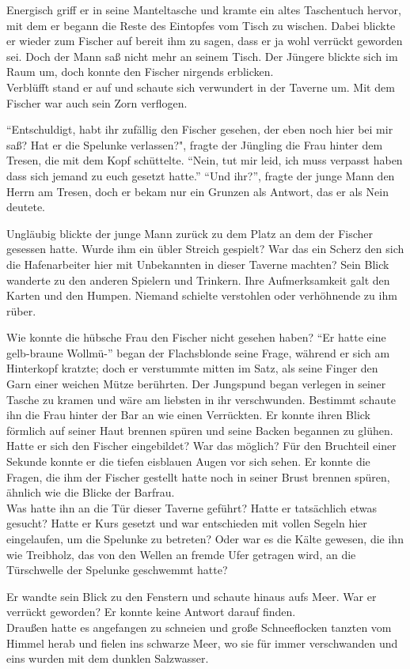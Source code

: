 Energisch griff er in seine Manteltasche und kramte ein altes Taschentuch hervor, mit dem er begann die Reste des Eintopfes vom Tisch zu wischen. Dabei blickte er wieder zum Fischer auf bereit ihm zu sagen, dass er ja wohl verrückt geworden sei. Doch der Mann saß nicht mehr an seinem Tisch. Der Jüngere blickte sich im Raum um, doch konnte den Fischer nirgends erblicken.\\

Verblüfft stand er auf und schaute sich verwundert in der Taverne um. Mit dem Fischer war auch sein Zorn verflogen.

``Entschuldigt, habt ihr zufällig den Fischer gesehen, der eben noch hier bei mir saß? Hat er die Spelunke verlassen?", fragte der Jüngling die Frau hinter dem Tresen, die mit dem Kopf schüttelte. 
``Nein, tut mir leid, ich muss verpasst haben dass sich jemand zu euch gesetzt hatte.''
``Und ihr?'', fragte der junge Mann den Herrn am Tresen, doch er bekam nur ein Grunzen als Antwort, das er als Nein deutete.

Ungläubig blickte der junge Mann zurück zu dem Platz an dem der Fischer gesessen hatte. Wurde ihm ein übler Streich gespielt? War das ein Scherz den sich die Hafenarbeiter hier mit Unbekannten in dieser Taverne machten?
Sein Blick wanderte zu den anderen Spielern und Trinkern. Ihre Aufmerksamkeit galt den Karten und den Humpen. Niemand schielte verstohlen oder verhöhnende zu ihm rüber.

Wie konnte die hübsche Frau den Fischer nicht gesehen haben? 
``Er hatte eine gelb-braune Wollmü-'' began der Flachsblonde seine Frage, während er sich am Hinterkopf kratzte; doch er verstummte mitten im Satz, als seine Finger den Garn einer weichen Mütze berührten.
Der Jungspund began verlegen in seiner Tasche zu kramen und wäre am liebsten in ihr verschwunden. Bestimmt schaute ihn die Frau hinter der Bar an wie einen Verrückten. Er konnte ihren Blick förmlich auf seiner Haut brennen spüren und seine Backen begannen zu glühen.
Hatte er sich den Fischer eingebildet? War das möglich? 
Für den Bruchteil einer Sekunde konnte er die tiefen eisblauen Augen vor sich sehen.
Er konnte die Fragen, die ihm der Fischer gestellt hatte noch in seiner Brust brennen spüren, ähnlich wie die Blicke der Barfrau.\\

Was hatte ihn an die Tür dieser Taverne geführt? Hatte er tatsächlich etwas gesucht? Hatte er Kurs gesetzt und war entschieden mit vollen Segeln hier eingelaufen, um die Spelunke zu betreten? Oder war es die Kälte gewesen, die ihn wie Treibholz, das von den Wellen an fremde Ufer getragen wird, an die Türschwelle der Spelunke geschwemmt hatte?

Er wandte sein Blick zu den Fenstern und schaute hinaus aufs Meer.
War er verrückt geworden?
Er konnte keine Antwort darauf finden.\\

Draußen hatte es angefangen zu schneien und große Schneeflocken tanzten vom Himmel herab und fielen ins schwarze Meer, wo sie für immer verschwanden und eins wurden mit dem dunklen Salzwasser.

